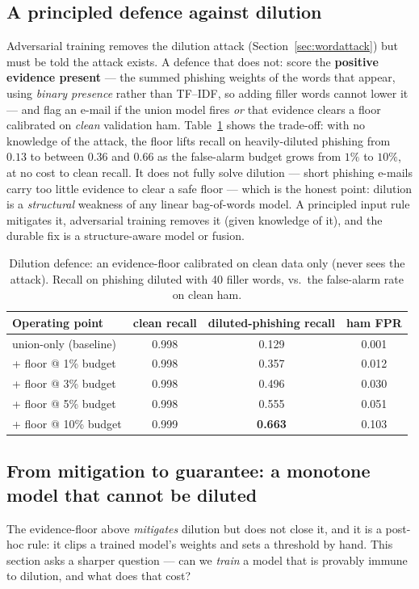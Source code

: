 \documentclass[11pt]{article}
\begin{document}
\subsection{A principled defence against dilution}
\label{sec:dilutiondef}
Adversarial training removes the dilution attack (Section~\ref{sec:wordattack}) but must be told the
attack exists. A defence that does not: score the \textbf{positive evidence present} --- the summed
phishing weights of the words that appear, using \emph{binary presence} rather than TF--IDF, so adding
filler words cannot lower it --- and flag an e-mail if the union model fires \emph{or} that evidence
clears a floor calibrated on \emph{clean} validation ham. Table~\ref{tab:dilutiondef} shows the
trade-off: with no knowledge of the attack, the floor lifts recall on heavily-diluted phishing from
$0.13$ to between $0.36$ and $0.66$ as the false-alarm budget grows from $1\%$ to $10\%$, at no cost to
clean recall. It does not fully solve dilution --- short phishing e-mails carry too little evidence to
clear a safe floor --- which is the honest point: dilution is a \emph{structural} weakness of any
linear bag-of-words model. A principled input rule mitigates it, adversarial training removes it (given
knowledge of it), and the durable fix is a structure-aware model or fusion.

\begin{table}[t]
\centering
\caption{Dilution defence: an evidence-floor calibrated on clean data only (never sees the attack).
Recall on phishing diluted with 40 filler words, vs.\ the false-alarm rate on clean ham.}
\label{tab:dilutiondef}
\begin{tabular}{lccc}
\toprule
Operating point & clean recall & diluted-phishing recall & ham FPR \\
\midrule
union-only (baseline) & 0.998 & 0.129 & 0.001 \\
+ floor @ 1\% budget  & 0.998 & 0.357 & 0.012 \\
+ floor @ 3\% budget  & 0.998 & 0.496 & 0.030 \\
+ floor @ 5\% budget  & 0.998 & 0.555 & 0.051 \\
+ floor @ 10\% budget & 0.999 & \textbf{0.663} & 0.103 \\
\bottomrule
\end{tabular}
\end{table}

\subsection{From mitigation to guarantee: a monotone model that cannot be diluted}
\label{sec:monotone}
The evidence-floor above \emph{mitigates} dilution but does not close it, and it is a post-hoc rule:
it clips a trained model's weights and sets a threshold by hand. This section asks a sharper question
--- can we \emph{train} a model that is provably immune to dilution, and what does that cost?
\end{document}
